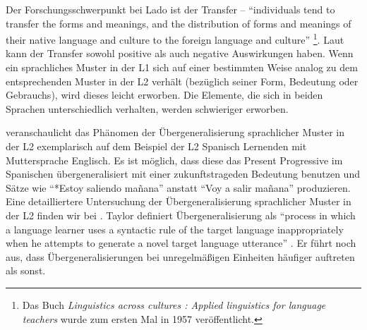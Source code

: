 Der Forschungsschwerpunkt bei Lado ist der Transfer --
``individuals tend to transfer the forms and meanings, and the distribution of forms and meanings of their native language and culture to the foreign language and culture''\cite{Lado71}
\footnote{Das Buch \textit{Linguistics across cultures : Applied linguistics
for language teachers} wurde zum ersten Mal in 1957 veröffentlicht.}.
Laut \cite{Lado71} kann der Transfer sowohl positive als auch negative Auswirkungen haben.
Wenn ein sprachliches Muster in der L1 sich auf einer bestimmten Weise analog zu dem entsprechenden Muster in der L2 verhält (bezüglich seiner Form, Bedeutung oder Gebrauchs), wird dieses leicht erworben.
Die Elemente, die sich in beiden Sprachen unterschiedlich verhalten, werden schwieriger erworben.

\cite{Braidi99} veranschaulicht das Phänomen der Übergeneralisierung sprachlicher Muster in der L2 exemplarisch auf dem Beispiel der L2 Spanisch Lernenden mit Muttersprache Englisch.
Es ist möglich, dass diese das Present Progressive im Spanischen übergeneralisiert mit einer zukunftstrageden Bedeutung benutzen und Sätze wie ``*Estoy saliendo mañana'' anstatt ``Voy a salir mañana'' produzieren.
Eine detailliertere Untersuchung der Übergeneralisierung sprachlicher Muster in der L2
finden wir bei \cite{Taylor75}.
Taylor definiert Übergeneralisierung als ``process in which a language learner uses a syntactic rule of the
target language inappropriately when he attempts to generate a novel target language utterance'' \cite{Taylor75}.
Er führt noch aus, dass Übergeneralisierungen bei unregelmäßigen Einheiten häufiger auftreten als sonst.




